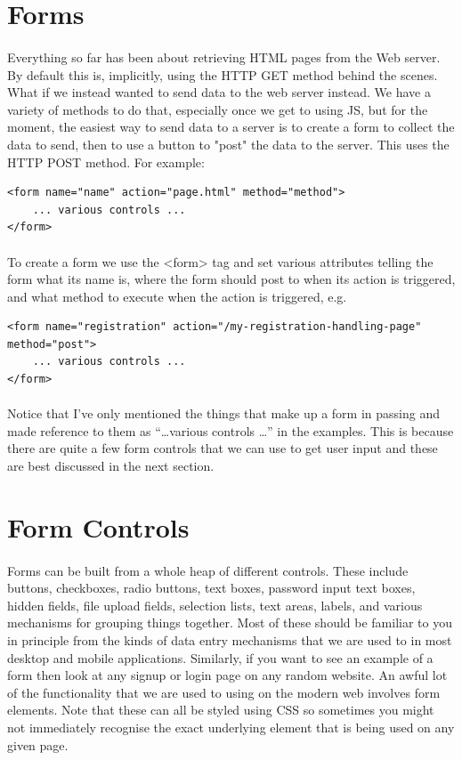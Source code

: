\section{Forms}
\paragraph{} Everything so far has been about retrieving HTML pages from the Web server. By default this is, implicitly, using the HTTP GET method behind the scenes. What if we instead wanted to send data to the web server instead. We have a variety of methods to do that, especially once we get to using JS, but for the moment, the easiest way to send data to a server is to create a form to collect the data to send, then to use a button to "post" the data to the server. This uses the HTTP POST method. For example:
\begin{lstlisting}
<form name="name" action="page.html" method="method">
    ... various controls ...
</form>
\end{lstlisting}
\paragraph{} To create a form we use the <form> tag and set various attributes telling the form what its name is, where the form should post to when its action is triggered, and what method to execute when the action is triggered, e.g.
\begin{lstlisting}
<form name="registration" action="/my-registration-handling-page" method="post">
    ... various controls ...
</form>
\end{lstlisting}
\paragraph{} Notice that I've only mentioned the things that make up a form in passing and made reference to them as ``\dots various controls \dots'' in the examples. This is because there are quite a few form controls that we can use to get user input and these are best discussed in the next section.


\section{Form Controls}
\paragraph{} Forms can be built from a whole heap of different controls. These include buttons, checkboxes, radio buttons, text boxes, password input text boxes, hidden fields, file upload fields, selection lists, text areas, labels, and various mechanisms for grouping things together. Most of these should be familiar to you in principle from the kinds of data entry mechanisms that we are used to in most desktop and mobile applications. Similarly, if you want to see an example of a form then look at any signup or login page on any random website. An awful lot of the functionality that we are used to using on the modern web involves form elements. Note that these can all be styled using CSS so sometimes you might not immediately recognise the exact underlying element that is being used on any given page.

